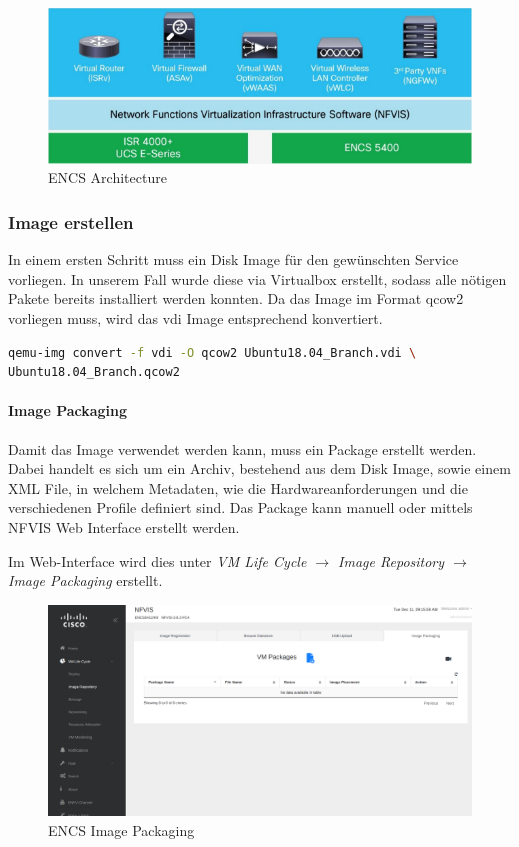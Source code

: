 \begin{figure}[H]
	\centering
	\includegraphics[width=0.8\linewidth]{img/Absicherung/ENCS_Architecture.png}
	\caption{ENCS Architecture \cite{enterprise-network-functions-virtualization-faq} }
	\label{fig:ENCS Architecture}
\end{figure}

\subsubsection{Image erstellen}

In einem ersten Schritt muss ein Disk Image für den gewünschten Service vorliegen. In unserem Fall wurde diese via Virtualbox erstellt, sodass alle nötigen Pakete bereits installiert werden konnten. Da das Image im Format qcow2 vorliegen muss, wird das vdi Image entsprechend konvertiert.

\begin{lstlisting}[language=bash]
qemu-img convert -f vdi -O qcow2 Ubuntu18.04_Branch.vdi \
Ubuntu18.04_Branch.qcow2
\end{lstlisting}

\paragraph{Image Packaging}

Damit das Image verwendet werden kann, muss ein Package erstellt werden. Dabei handelt es sich um ein Archiv, bestehend aus dem Disk Image, sowie einem XML File, in welchem Metadaten, wie die Hardwareanforderungen und die verschiedenen Profile definiert sind.
Das Package kann manuell oder mittels NFVIS Web Interface erstellt werden.

Im Web-Interface wird dies unter \textit{VM Life Cycle $\rightarrow$ Image Repository $\rightarrow$ Image Packaging} erstellt.

\begin{figure}[H]
	\centering
	\includegraphics[width=0.8\linewidth]{img/Absicherung/ENCS-Image-Packaging.png}
	\caption{ENCS Image Packaging}
	\label{fig:ENCS Image Packaging}
\end{figure}

